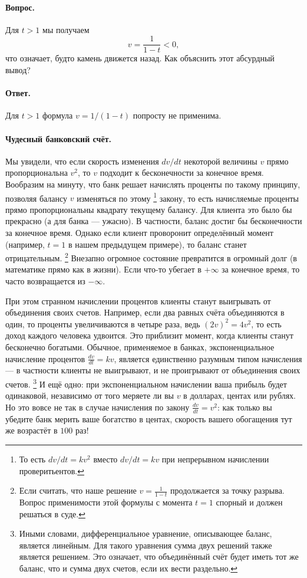 \paragraph{Вопрос.}
Для $t > 1$ мы получаем
\[
v = \frac{1}{1 - t} < 0,
\]
что означает, будто камень движется назад.
Как объяснить этот абсурдный вывод?

\paragraph{Ответ.}
Для $t > 1$ формула $v = 1/(1 - t)$
попросту не применима.

\paragraph{Чудесный банковский счёт.}
Мы увидели, что если скорость изменения $dv/dt$
некоторой величины $v$ прямо пропорциональна $v^{2}$,
то $v$ подходит к бесконечности за конечное время.
Вообразим на минуту, что банк решает начислять проценты по такому принципу,
позволяя балансу $v$ изменяться по этому%
\footnote{То есть $dv/dt = kv^2$ вместо $dv/dt = kv$ при непрерывном начислении проверитьентов.}
закону, то есть начисляемые проценты прямо пропорциональны квадрату текущему балансу.
Для клиента это было бы прекрасно (а для банка --- ужасно).
В частности, баланс достиг бы бесконечности за конечное время.
Однако если клиент проворонит определённый момент (например, $t = 1$ в нашем предыдущем примере), то баланс станет отрицательным.%
\footnote{Если считать, что наше решение
$v = \frac{1}{1 - t}$ продолжается за точку разрыва. Вопрос применимости этой формулы с момента $t = 1$ спорный и должен решаться в суде.}
Внезапно огромное состояние превратится в огромный долг (в математике прямо как в жизни).
Если что-то убегает в $+\infty$ за конечное время, то часто возвращается из $-\infty$.

При этом странном начислении процентов клиенты станут выигрывать от объединения своих счетов.
Например, если два равных счёта объединяются в один,
то проценты увеличиваются в четыре раза, ведь
$(2v)^2 = 4v^2$,
то есть доход каждого человека удвоится.
Это приблизит момент, когда клиенты станут бесконечно богатыми.
Обычное,
применяемое в банках, экспоненциальное начисление процентов
$\frac{dv}{dt} = kv$, является единственно разумным типом начисления ---
в частности клиенты не выигрывают, и не проигрывают
от объединения своих счетов.%
\footnote{Иными словами, дифференциальное уравнение, описывающее баланс, является линейным.
Для такого уравнения сумма двух решений также является решением.
Это означает, что объединённый счёт будет иметь тот же баланс, что и сумма двух счетов, если их вести раздельно.}
И ещё одно: при экспоненциальном начислении ваша прибыль будет одинаковой, независимо от того меряете ли вы $v$ в долларах, центах или рублях.
Но это вовсе не так в случае начисления по закону $\tfrac{dv}{dt} = v^2$:
как только вы убедите банк мерить ваше богатство в центах, скорость вашего обогащения тут же возрастёт в $100$ раз!

